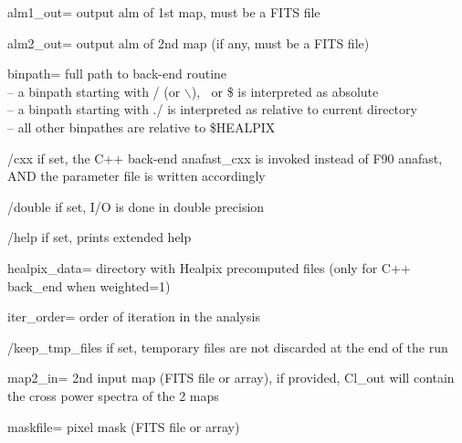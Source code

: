 \begin{keywords}
  \begin{kwlist}{} %
\item[alm1\_out=]   output alm of 1st map, must be a FITS file          

\item[alm2\_out=]   output alm of 2nd map (if any, must be a FITS file) 

\item[binpath=] full path to back-end routine \\
              -- a binpath starting with / (or $\backslash$), $~$ or \$ is interpreted as absolute\\
              -- a binpath starting with ./ is interpreted as relative to current directory\\
              -- all other binpathes are relative to \$HEALPIX

\item[/cxx] if set, the C++ back-end anafast\_cxx is invoked instead of F90 anafast,
           AND the parameter file is written accordingly

\item[/double]    if set, I/O is done in double precision 

\item[/help]      if set, prints extended help

\item[healpix\_data=] directory with Healpix precomputed files (only for C++ back\_end when weighted=1)

\item[iter\_order=] order of iteration in the analysis 

\item[/keep\_tmp\_files] if set, temporary files are not discarded at the end of the
                  run

\item[map2\_in=] 2nd input map (FITS file or array), if provided, Cl\_out will
  contain the cross power spectra of the 2 maps 

\item[maskfile=] pixel mask (FITS file or array)   


\end{kwlist}
\end{keywords}
